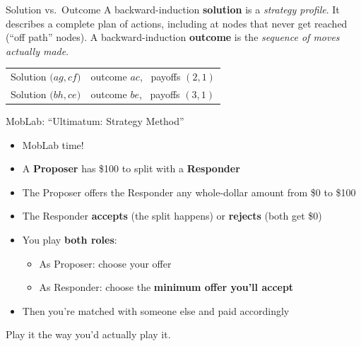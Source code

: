 \begin{frame}{Solution vs.\ Outcome}
A backward-induction \textbf{solution} is a \textit{strategy profile}. It describes
a complete plan of actions, including at nodes that never get reached (``off path'' nodes).
\bsk
A backward-induction \textbf{outcome} is the \textit{sequence of moves actually made}.
\bsk
\centering
\begin{tabular}{ll}
Solution $\big(ag,cf\big)$ & outcome $ac$, \ payoffs $(2,1)$ \\[0.15in]
Solution $\big(bh,ce\big)$ & outcome $be$, \ payoffs $(3,1)$ \\
\end{tabular}
\end{frame}


\begin{frame}{MobLab: ``Ultimatum: Strategy Method''}
\begin{itemize}
    \item MobLab time!
    \item A \textbf{Proposer} has \$100 to split with a \textbf{Responder}
    \item The Proposer offers the Responder any whole-dollar amount from \$0 to \$100
    \item The Responder \textbf{accepts} (the split happens) or \textbf{rejects} (both get \$0)
    \item You play \textbf{both roles}:
    \begin{itemize}
        \item As Proposer: choose your offer
        \item As Responder: choose the \textbf{minimum offer you'll accept}
    \end{itemize}
    \item Then you're matched with someone else and paid accordingly
\end{itemize}
\vfill
\centering
Play it the way you'd actually play it.
\vspace{-0.3in}
\end{frame}


